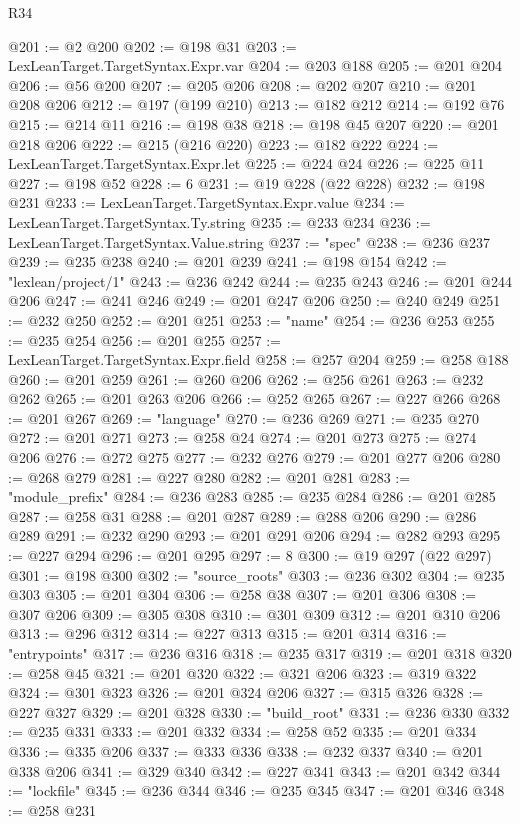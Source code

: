 \begin{lexlean}{R34}
\begin{coremodule}
@201 := @2 @200
@202 := @198 @31
@203 := LexLeanTarget.TargetSyntax.Expr.var
@204 := @203 @188
@205 := @201 @204
@206 := @56 @200
@207 := @205 @206
@208 := @202 @207
@210 := @201 @208 @206
@212 := @197 (@199 @210)
@213 := @182 @212
@214 := @192 @76
@215 := @214 @11
@216 := @198 @38
@218 := @198 @45 @207
@220 := @201 @218 @206
@222 := @215 (@216 @220)
@223 := @182 @222
@224 := LexLeanTarget.TargetSyntax.Expr.let
@225 := @224 @24
@226 := @225 @11
@227 := @198 @52
@228 := 6
@231 := @19 @228 (@22 @228)
@232 := @198 @231
@233 := LexLeanTarget.TargetSyntax.Expr.value
@234 := LexLeanTarget.TargetSyntax.Ty.string
@235 := @233 @234
@236 := LexLeanTarget.TargetSyntax.Value.string
@237 := "spec"
@238 := @236 @237
@239 := @235 @238
@240 := @201 @239
@241 := @198 @154
@242 := "lexlean/project/1"
@243 := @236 @242
@244 := @235 @243
@246 := @201 @244 @206
@247 := @241 @246
@249 := @201 @247 @206
@250 := @240 @249
@251 := @232 @250
@252 := @201 @251
@253 := "name"
@254 := @236 @253
@255 := @235 @254
@256 := @201 @255
@257 := LexLeanTarget.TargetSyntax.Expr.field
@258 := @257 @204
@259 := @258 @188
@260 := @201 @259
@261 := @260 @206
@262 := @256 @261
@263 := @232 @262
@265 := @201 @263 @206
@266 := @252 @265
@267 := @227 @266
@268 := @201 @267
@269 := "language"
@270 := @236 @269
@271 := @235 @270
@272 := @201 @271
@273 := @258 @24
@274 := @201 @273
@275 := @274 @206
@276 := @272 @275
@277 := @232 @276
@279 := @201 @277 @206
@280 := @268 @279
@281 := @227 @280
@282 := @201 @281
@283 := "module_prefix"
@284 := @236 @283
@285 := @235 @284
@286 := @201 @285
@287 := @258 @31
@288 := @201 @287
@289 := @288 @206
@290 := @286 @289
@291 := @232 @290
@293 := @201 @291 @206
@294 := @282 @293
@295 := @227 @294
@296 := @201 @295
@297 := 8
@300 := @19 @297 (@22 @297)
@301 := @198 @300
@302 := "source_roots"
@303 := @236 @302
@304 := @235 @303
@305 := @201 @304
@306 := @258 @38
@307 := @201 @306
@308 := @307 @206
@309 := @305 @308
@310 := @301 @309
@312 := @201 @310 @206
@313 := @296 @312
@314 := @227 @313
@315 := @201 @314
@316 := "entrypoints"
@317 := @236 @316
@318 := @235 @317
@319 := @201 @318
@320 := @258 @45
@321 := @201 @320
@322 := @321 @206
@323 := @319 @322
@324 := @301 @323
@326 := @201 @324 @206
@327 := @315 @326
@328 := @227 @327
@329 := @201 @328
@330 := "build_root"
@331 := @236 @330
@332 := @235 @331
@333 := @201 @332
@334 := @258 @52
@335 := @201 @334
@336 := @335 @206
@337 := @333 @336
@338 := @232 @337
@340 := @201 @338 @206
@341 := @329 @340
@342 := @227 @341
@343 := @201 @342
@344 := "lockfile"
@345 := @236 @344
@346 := @235 @345
@347 := @201 @346
@348 := @258 @231

\end{coremodule}
\end{lexlean}
